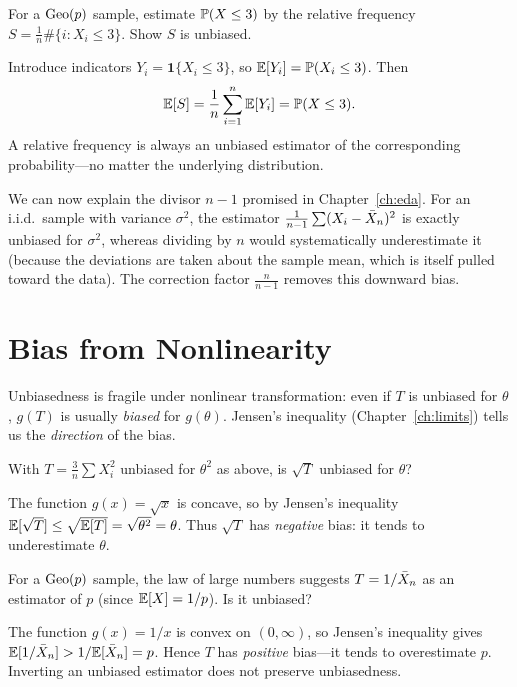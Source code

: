 \begin{example}
For a $\mathrm{Geo}(p)$ sample, estimate $\mathbb{P}(X\le 3)$ by the relative frequency
$S=\tfrac1n\#\{i:X_i\le 3\}$. Show $S$ is unbiased.

\solution Introduce indicators $Y_i=\mathbf 1\{X_i\le 3\}$, so
$\mathbb{E}[Y_i]=\mathbb{P}(X_i\le 3)$. Then
\[
  \mathbb{E}[S]=\frac1n\sum_{i=1}^n\mathbb{E}[Y_i]=\mathbb{P}(X\le 3).
\]
A relative frequency is always an unbiased estimator of the corresponding
probability—no matter the underlying distribution.
\end{example}

\begin{remark}
We can now explain the divisor $n-1$ promised in Chapter~\ref{ch:eda}. For an
i.i.d.\ sample with variance $\sigma^2$, the estimator
$\frac1{n-1}\sum(X_i-\bar{X}_n)^2$ is exactly unbiased for $\sigma^2$, whereas
dividing by $n$ would systematically underestimate it (because the deviations are
taken about the sample mean, which is itself pulled toward the data). The
correction factor $\tfrac{n}{n-1}$ removes this downward bias.
\end{remark}

\section{Bias from Nonlinearity}

Unbiasedness is fragile under nonlinear transformation: even if $T$ is unbiased
for $\theta$, $g(T)$ is usually \emph{biased} for $g(\theta)$. Jensen's
inequality (Chapter~\ref{ch:limits}) tells us the \emph{direction} of the bias.

\begin{example}
With $T=\tfrac3n\sum X_i^2$ unbiased for $\theta^2$ as above, is $\sqrt T$
unbiased for $\theta$?

\solution The function $g(x)=\sqrt x$ is concave, so by Jensen's inequality
$\mathbb{E}[\sqrt T]\le\sqrt{\mathbb{E}[T]}=\sqrt{\theta^2}=\theta$. Thus $\sqrt T$ has
\emph{negative} bias: it tends to underestimate $\theta$.
\end{example}

\begin{example}
For a $\mathrm{Geo}(p)$ sample, the law of large numbers suggests $T=1/\bar{X}_n$ as an
estimator of $p$ (since $\mathbb{E}[X]=1/p$). Is it unbiased?

\solution The function $g(x)=1/x$ is convex on $(0,\infty)$, so Jensen's
inequality gives $\mathbb{E}[1/\bar{X}_n]>1/\mathbb{E}[\bar{X}_n]=p$. Hence $T$ has \emph{positive}
bias—it tends to overestimate $p$. Inverting an unbiased estimator does not
preserve unbiasedness.
\end{example}

